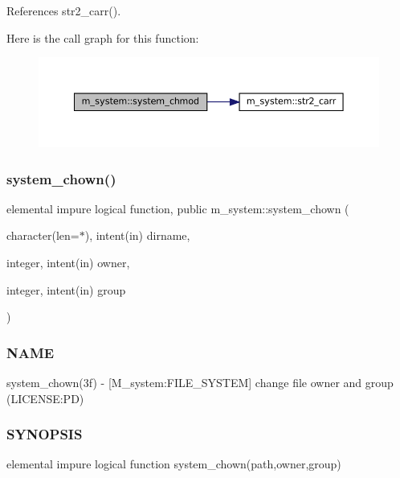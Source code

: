 References str2\+\_\+carr().

Here is the call graph for this function\+:\nopagebreak
\begin{figure}[H]
\begin{center}
\leavevmode
\includegraphics[width=350pt]{namespacem__system_ace9ce0c8a9c8341a76b8903cd2390ce3_cgraph}
\end{center}
\end{figure}
\mbox{\label{namespacem__system_ab89e4d2fb219225c374570d4f9d58e9b}} 
\subsubsection{\texorpdfstring{system\+\_\+chown()}{system\_chown()}}
{\footnotesize\ttfamily elemental impure logical function, public m\+\_\+system\+::system\+\_\+chown (\begin{DoxyParamCaption}\item[{character(len=$\ast$), intent(in)}]{dirname,  }\item[{integer, intent(in)}]{owner,  }\item[{integer, intent(in)}]{group }\end{DoxyParamCaption})}



\subsubsection*{N\+A\+ME}

system\+\_\+chown(3f) -\/ \mbox{[}M\+\_\+system\+:F\+I\+L\+E\+\_\+\+S\+Y\+S\+T\+EM\mbox{]} change file owner and group (L\+I\+C\+E\+N\+SE\+:PD) 

\subsubsection*{S\+Y\+N\+O\+P\+S\+IS}

elemental impure logical function system\+\_\+chown(path,owner,group)

